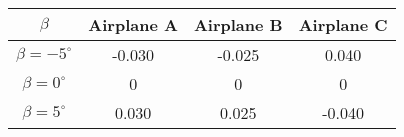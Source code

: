 \begin{tabular}{|c|c|c|c|}
    \hline
    $\beta$ & Airplane A & Airplane B & Airplane C \\ \hline
    $\beta = -5^\circ$ & -0.030 & -0.025 & 0.040 \\ \hline
    $\beta = 0^\circ$ & 0 & 0 & 0 \\ \hline
    $\beta = 5^\circ$ & 0.030 & 0.025 & -0.040 \\ \hline
\end{tabular}